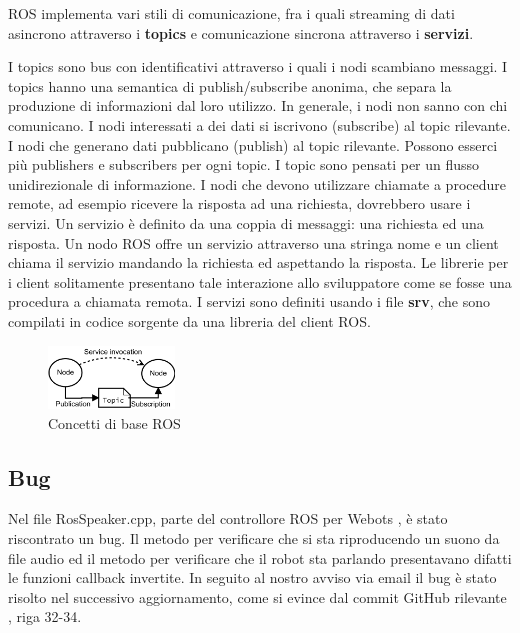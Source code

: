 \documentclass[a4paper]{article}
\begin{document}
	ROS implementa vari stili di comunicazione, fra i quali streaming di dati
	asincrono attraverso i \textbf{topics} e comunicazione sincrona attraverso
	i \textbf{servizi}. 

	I topics sono bus con identificativi attraverso i quali i nodi scambiano
	messaggi. I topics hanno una semantica di publish/subscribe anonima, che
	separa la produzione di informazioni dal loro utilizzo. In generale, i nodi
	non sanno con chi comunicano. I nodi interessati a dei dati si iscrivono
	(subscribe) al topic rilevante. I nodi che generano dati pubblicano
	(publish) al topic rilevante. Possono esserci più publishers e subscribers
	per ogni topic. I topic sono pensati per un flusso unidirezionale di
	informazione. I nodi che devono utilizzare chiamate a procedure remote, ad
	esempio ricevere la risposta ad una richiesta, dovrebbero usare i servizi.
	Un servizio è definito da una coppia di messaggi: una richiesta ed una
	risposta. 
	Un nodo ROS offre un servizio attraverso una stringa nome e un
	client chiama il servizio mandando la richiesta ed aspettando la risposta.
	Le librerie per i client solitamente presentano tale interazione allo
	sviluppatore come se fosse una procedura a chiamata remota. I servizi sono
	definiti usando i file \textbf{srv}, che sono compilati in codice sorgente
	da una libreria del client ROS.
	
	\begin{figure}[H]
		\centering
		\includegraphics[width=0.3\textwidth]{./img/ROS_basic_concepts.pdf}
		\caption{Concetti di base ROS}
		\label{fig:ros_concepts}
	\end{figure}
	
	\subsection{Bug}\label{subsec:Bug}
	Nel file RosSpeaker.cpp, parte del controllore ROS per Webots
	\cite{cyberbotics}, è stato riscontrato un bug. Il metodo per verificare
	che si sta riproducendo un suono da file audio ed il metodo per verificare
	che il robot sta parlando presentavano difatti le funzioni callback
	invertite. In seguito al nostro avviso via email il bug è stato risolto nel
	successivo aggiornamento, come si evince dal commit GitHub rilevante
	\cite{rosbug}, riga 32-34.
	
\end{document}
